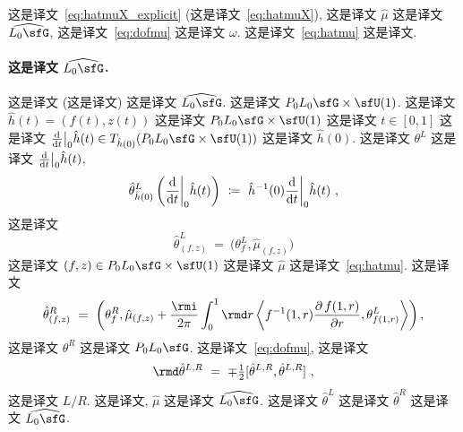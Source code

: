 \documentclass[
    affil-it, %
    auth-lg, %
    british, %
    compression, %
    contents, %
    custom-packages={}, %
    references={bigone}, %
]{lib/preprint}
\begin{document}
\begin{body}
 这是译文~\eqref{eq:hatmuX_explicit} (这是译文~\eqref{eq:hatmuX}), 这是译文 $\hat\mu$ 这是译文 $\widehat{L_0\sfG}$, 这是译文~\eqref{eq:dofmu} 这是译文 $\omega$. 这是译文~\eqref{eq:hatmu} 这是译文.
        
        \paragraph{这是译文 $\widehat{L_0\sfG}$.}
 这是译文 (这是译文) 这是译文 $\widehat{L_0\sfG}$. 这是译文 $P_0L_0\sfG\times\sfU(1)$. 这是译文 $\hat h(t)=(f(t),z(t))$ 这是译文 $P_0L_0\sfG\times\sfU(1)$ 这是译文 $t\in[0,1]$ 这是译文 $\dder{t}\big|_0\hat h(t)\in T_{\hat h(0)}(P_0L_0\sfG\times\sfU(1))$ 这是译文 $\hat h(0)$. 这是译文 $\theta^L$ 这是译文 $\dder{t}\big|_0\hat h(t)$,         \begin{equation}
            \hat\theta^L_{\hat h(0)}\left(\dder{t}\bigg|_0\hat h(t)\right)\ \coloneqq\ \hat h^{-1}(0)\dder{t}\bigg|_0\hat h(t)~,
        \end{equation}  这是译文         \begin{equation}\label{eq:mcl}
            \hat\theta^L_{(f,z)}\ =\ \big(\theta^L_f,\hat\mu_{(f,z)}\big)
        \end{equation}  这是译文 $(f,z)\in P_0L_0\sfG\times\sfU(1)$ 这是译文 $\hat\mu$ 这是译文~\eqref{eq:hatmu}. 这是译文 
        \begin{equation}\label{eq:mcr}
            \hat\theta^R_{(f,z)}\ =\ \left(\theta^R_f,\hat\mu_{(f,z)}+\frac{\rmi}{2\pi}\int_0^1\rmd r\innerLarge{f^{-1}(1,r)\parder[\,f(1,r)]{r}}{\theta^L_{f(1,r)}}\right),
        \end{equation}  这是译文 $\theta^R$ 这是译文 $P_0L_0\sfG$. 这是译文~\eqref{eq:dofmu}, 这是译文         \begin{equation}
            \rmd\hat\theta^{L,R}\ =\ \mp\tfrac12[\hat\theta^{L,R},\hat\theta^{L,R}]~,
        \end{equation}  这是译文 $ L/R $. 这是译文, $\hat\mu$ 这是译文 $\widehat{L_0\sfG}$. 这是译文 $\hat\theta^L$ 这是译文 $\hat\theta^R $ 这是译文 $\widehat{L_0\sfG}$. 
        

\end{body}
\end{document}

